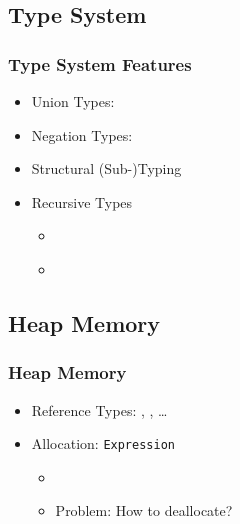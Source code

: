 \subsection{Type System}
\begin{frame}
	\frametitle{Type System Features}
	\begin{itemize}
		\item<+-> Union Types: 
		\item<+-> Negation Types: 
		\item<+-> Structural (Sub-)Typing
		\item<+-> Recursive Types
		\begin{itemize}
			\item {}
			\item<+-> \\
		\end{itemize}
	\end{itemize}
\end{frame}



\subsection{Heap Memory}
\begin{frame}
	\frametitle{Heap Memory}
	\begin{itemize}[<+->]
		\item Reference Types: , , \ldots
		\item Allocation:  \texttt{Expression}
		\begin{itemize}
			\item {}
			\item \alert{Problem}: How to deallocate?
		\end{itemize}
	\end{itemize}
\end{frame}

